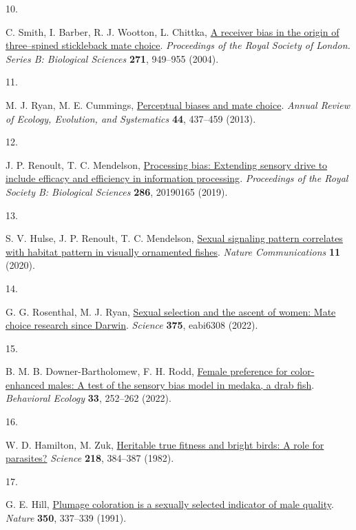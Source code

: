 \documentclass[
]{article}
\newlength{\cslhangindent}
\newlength{\csllabelwidth}
\newenvironment{CSLReferences}[2] %
 {\begin{list}{}{%
  \setlength{\itemindent}{0pt}
  \setlength{\leftmargin}{0pt}
  \setlength{\parsep}{0pt}
  \ifodd #1
   \setlength{\leftmargin}{\cslhangindent}
   \setlength{\itemindent}{-1\cslhangindent}
  \fi
  \setlength{\itemsep}{#2\baselineskip}}}
 {\end{list}}
\newcommand{\CSLLeftMargin}[1]{\parbox[t]{\csllabelwidth}{\strut#1\strut}}
\newcommand{\CSLRightInline}[1]{\parbox[t]{\linewidth - \csllabelwidth}{\strut#1\strut}}
\begin{document}
\begin{CSLReferences}{0}{0}
\CSLLeftMargin{10. }%
\CSLRightInline{C. Smith, I. Barber, R. J. Wootton, L. Chittka,
\href{https://doi.org/10.1098/rspb.2004.2690}{A receiver bias in the
origin of three--spined stickleback mate choice}. \emph{Proceedings of
the Royal Society of London. Series B: Biological Sciences}
\textbf{271}, 949--955 (2004).}

\CSLLeftMargin{11. }%
\CSLRightInline{M. J. Ryan, M. E. Cummings,
\href{https://doi.org/10.1146/annurev-ecolsys-110512-135901}{Perceptual
biases and mate choice}. \emph{Annual Review of Ecology, Evolution, and
Systematics} \textbf{44}, 437--459 (2013).}

\CSLLeftMargin{12. }%
\CSLRightInline{J. P. Renoult, T. C. Mendelson,
\href{https://doi.org/10.1098/rspb.2019.0165}{Processing bias: Extending
sensory drive to include efficacy and efficiency in information
processing}. \emph{Proceedings of the Royal Society B: Biological
Sciences} \textbf{286}, 20190165 (2019).}

\CSLLeftMargin{13. }%
\CSLRightInline{S. V. Hulse, J. P. Renoult, T. C. Mendelson,
\href{https://www.ncbi.nlm.nih.gov/pubmed/32444815}{Sexual signaling
pattern correlates with habitat pattern in visually ornamented fishes}.
\emph{Nature Communications} \textbf{11} (2020).}

\CSLLeftMargin{14. }%
\CSLRightInline{G. G. Rosenthal, M. J. Ryan,
\href{https://doi.org/10.1126/science.abi6308}{Sexual selection and the
ascent of women: {Mate} choice research since {Darwin}}. \emph{Science}
\textbf{375}, eabi6308 (2022).}

\CSLLeftMargin{15. }%
\CSLRightInline{B. M. B. Downer-Bartholomew, F. H. Rodd,
\href{https://doi.org/10.1093/beheco/arab131}{Female preference for
color-enhanced males: A test of the sensory bias model in medaka, a drab
fish}. \emph{Behavioral Ecology} \textbf{33}, 252--262 (2022).}

\CSLLeftMargin{16. }%
\CSLRightInline{W. D. Hamilton, M. Zuk,
\href{https://doi.org/10.1126/science.7123238}{Heritable true fitness
and bright birds: {A} role for parasites?} \emph{Science} \textbf{218},
384--387 (1982).}

\CSLLeftMargin{17. }%
\CSLRightInline{G. E. Hill,
\href{https://doi.org/10.1038/350337a0}{Plumage coloration is a sexually
selected indicator of male quality}. \emph{Nature} \textbf{350},
337--339 (1991).}


\end{CSLReferences}
\end{document}

